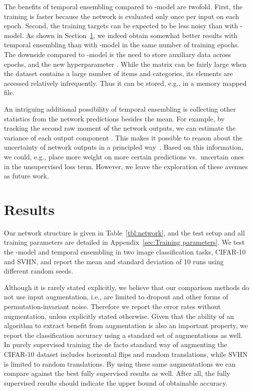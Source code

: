 \documentclass{article}
\begin{document}
The benefits of temporal ensembling compared to -model are twofold. First, the training is faster
because the network is evaluated only once per input on each epoch. Second, the training targets  can
be expected to be less noisy than with -model. As shown in Section~\ref{sec:results}, we indeed obtain
somewhat better results with temporal ensembling than with -model in the same number of training epochs.
The downside compared to -model is the need to store auxiliary data across epochs, and the new hyperparameter .
While the matrix  can be fairly large when the dataset contains a large number of items and categories, its elements are accessed relatively infrequently. Thus it can be stored, e.g., in a memory mapped file.

An intriguing additional possibility of temporal ensembling is collecting other statistics from the network
predictions  besides the mean. For example, by tracking the second raw moment of the network outputs,
we can estimate the variance of each output component . This makes it possible to reason about the
uncertainty of network outputs in a principled way~\citep{Gal16}. Based on this information, we could, e.g.,
place more weight on more certain predictions vs.~uncertain ones in the unsupervised loss term.
However, we leave the exploration of these avenues as future work.

\section{Results}
\label{sec:results}

Our network structure is given in Table~\ref{tbl:network}, and the test setup and all training parameters are detailed in Appendix~\ref{sec:Training parameters}. We test the -model and temporal ensembling in two image classification tasks, CIFAR-10 and SVHN, and report the mean and standard deviation of 10 runs using different random seeds.

Although it is rarely stated explicitly, we believe that our comparison methods do not use input augmentation, i.e., are limited to dropout and other forms of permutation-invariant noise. Therefore we report the error rates without augmentation, unless explicitly stated otherwise. Given that the ability of an algorithm to extract benefit from augmentation is also an important property, we report the classification accuracy using a standard set of augmentations as well. In purely supervised training the de facto standard way of augmenting the CIFAR-10 dataset includes horizontal flips and random translations, while SVHN is limited to random translations. By using these same augmentations we can compare against the best fully supervised results as well. After all, the fully supervised results should indicate the upper bound of obtainable accuracy. 
\end{document}
